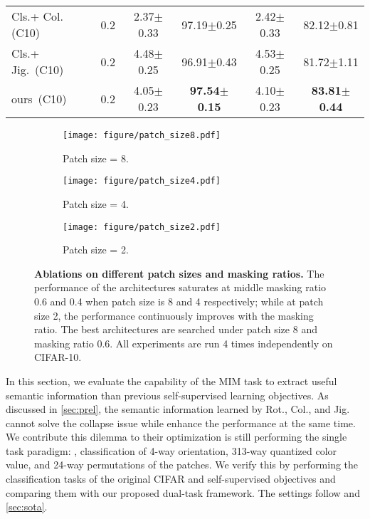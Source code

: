 \documentclass[10pt,twocolumn,letterpaper]{article}
\begin{document}
\begin{table*}
{\begin{tabular}{lccccc}
    Cls.+ Col.(C10)    & 0.2           & 2.37$\pm$0.33 & 97.19$\pm$0.25  & 2.42$\pm$0.33 & 82.12$\pm$0.81    \\
    Cls.+ Jig.~(C10)    &  0.2          & 4.48$\pm$0.25 & 96.91$\pm$0.43  & 4.53$\pm$0.25 & 81.72$\pm$1.11    \\
    ours~(C10)              & 0.2           & 4.05$\pm$0.23 & \textbf{97.54$\pm$0.15} & 4.10$\pm$0.23 & \textbf{83.81$\pm$0.44}  \\
    \bottomrule
\end{tabular}
}
\label{tab:unnas_with_multi}
\vspace{-6pt}
\end{table*} \begin{figure*}
  \centering
  \begin{subfigure}{0.28\linewidth}
    \texttt{[image: figure/patch\_size8.pdf]}
    \caption{Patch size = 8.}
    \label{fig:ps8}
  \end{subfigure}
\hspace{+8pt}
  \begin{subfigure}{0.28\linewidth}
    \texttt{[image: figure/patch\_size4.pdf]}
    \caption{Patch size = 4.}
    \label{fig:ps4}
  \end{subfigure}
\hspace{+8pt}
  \begin{subfigure}{0.28\linewidth}
    \texttt{[image: figure/patch\_size2.pdf]}
    \caption{Patch size = 2.}
    \label{fig:ps2}
  \end{subfigure}
  \vspace{-6pt}
  \caption{\textbf{Ablations on different patch sizes and masking ratios.}
  The performance of the architectures saturates at middle masking ratio 0.6 and 0.4 when patch size is 8 and 4 respectively; 
  while at patch size 2, the performance continuously improves with the masking ratio.
  The best architectures are searched under patch size 8 and masking ratio 0.6.
  All experiments are run 4 times independently on CIFAR-10.}
  \label{fig:c10_patch_size}
  \vspace{-6pt}
\end{figure*} In this section, we evaluate the capability of the MIM task to extract useful semantic information than previous self-supervised learning objectives.
As discussed in \cref{sec:prel}, the semantic information learned by Rot., Col., and Jig. cannot solve the collapse issue while enhance the performance at the same time.
We contribute this dilemma to their optimization is still performing the single task paradigm: \ie, classification of 4-way orientation, 313-way quantized color value, and 24-way permutations of the patches.
We verify this by performing the classification tasks of the original CIFAR and self-supervised objectives and comparing them with our proposed dual-task framework.
The settings follow \cite{liu_2020_unnas} and \cref{sec:sota}.
\end{document}
